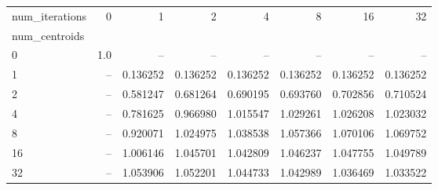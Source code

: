 \begin{tabular}{lrrrrrrr}
\toprule
num\_iterations &   0  &        1  &        2  &        4  &        8  &        16 &        32 \\
num\_centroids &      &           &           &           &           &           &           \\
\midrule
0             &  1.0 &       -- &       -- &       -- &       -- &       -- &       -- \\
1             &  -- &  0.136252 &  0.136252 &  0.136252 &  0.136252 &  0.136252 &  0.136252 \\
2             &  -- &  0.581247 &  0.681264 &  0.690195 &  0.693760 &  0.702856 &  0.710524 \\
4             &  -- &  0.781625 &  0.966980 &  1.015547 &  1.029261 &  1.026208 &  1.023032 \\
8             &  -- &  0.920071 &  1.024975 &  1.038538 &  1.057366 &  1.070106 &  1.069752 \\
16            &  -- &  1.006146 &  1.045701 &  1.042809 &  1.046237 &  1.047755 &  1.049789 \\
32            &  -- &  1.053906 &  1.052201 &  1.044733 &  1.042989 &  1.036469 &  1.033522 \\
\bottomrule
\end{tabular}
